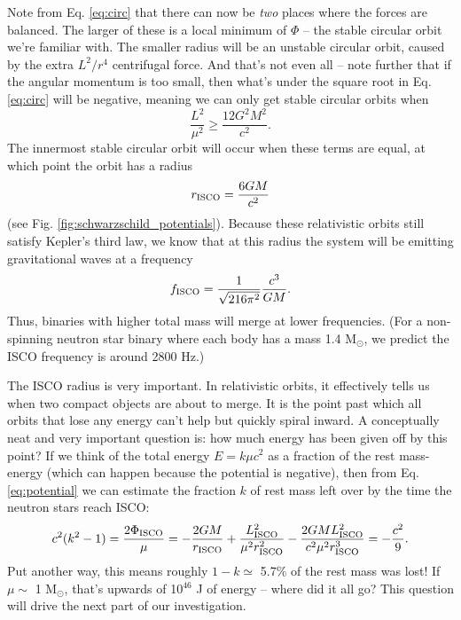 \documentclass[11pt]{article}
\begin{document}
\begin{enumerate}
\hspace{15pt} Note from Eq. \ref{eq:circ} that there can now be \emph{two} places where the forces are balanced. The larger of these is a local minimum of $\Phi$ -- the stable circular orbit we're familiar with. The smaller radius will be an unstable circular orbit, caused by the extra $L^2/r^4$ centrifugal force. And that's not even all -- note further that if the angular momentum is too small, then what's under the square root in Eq. \ref{eq:circ} will be negative, meaning we can only get stable circular orbits when
\begin{equation}
\frac{L^2}{\mu^2} \geq \frac{12G^2M^2}{c^2}.
\end{equation}
The innermost stable circular orbit will occur when these terms are equal, at which point the orbit has a radius
\begin{equation}
r_{\rm ISCO} = \frac{6GM}{c^2}
\end{equation}
(see Fig. \ref{fig:schwarzschild_potentials}). Because these relativistic orbits still satisfy Kepler's third law, we know that at this radius the system will be emitting gravitational waves at a frequency
\[ f_{\rm ISCO} = \frac{1}{\sqrt{216\pi^2}} \frac{c^3}{GM}. \]
Thus, binaries with higher total mass will merge at lower frequencies. (For a non-spinning neutron star binary where each body has a mass 1.4 M$_{\odot}$, we predict the ISCO frequency is around 2800 Hz.)

\hspace{15pt} The ISCO radius is very important. In relativistic orbits, it effectively tells us when two compact objects are about to merge. It is the point past which all orbits that lose any energy can't help but quickly spiral inward. A conceptually neat and very important question is: how much energy has been given off by this point? If we think of the total energy $E=k\mu c^2$ as a fraction of the rest mass-energy (which can happen because the potential is negative), then from Eq. \ref{eq:potential} we can estimate the fraction $k$ of rest mass left over by the time the neutron stars reach ISCO:
\[ c^2(k^2 - 1) = \frac{2\Phi_{\rm ISCO}}{\mu} = -\frac{2GM}{r_{\rm ISCO}} + \frac{L_{\rm ISCO}^2}{\mu^2 r_{\rm ISCO}^2} - \frac{2GML_{\rm ISCO}^2}{c^2\mu^2r_{\rm ISCO}^3} = -\frac{c^2}{9}. \]
Put another way, this means roughly $1-k \simeq$ 5.7\% of the rest mass was lost! If $\mu \sim$ 1 M$_{\odot}$, that's upwards of 10$^{46}$ J of energy --  where did it all go? This question will drive the next part of our investigation.


\end{enumerate}
\end{document}
